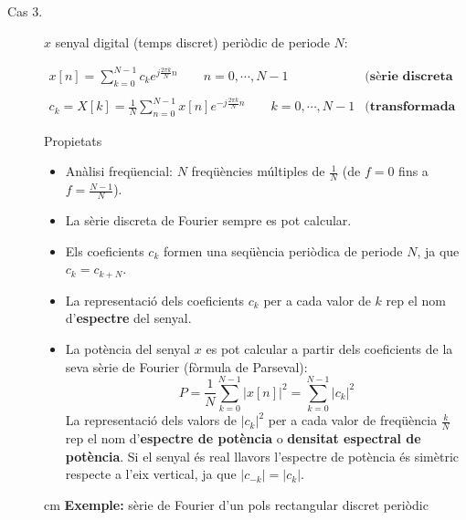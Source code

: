 \documentclass{article}
\begin{document}
\begin{description}
\newpage
\item[Cas 3.] $x$ senyal digital (temps discret) peri\`odic de periode $N$:

\[
\begin{array}{ll}
x[n]=\displaystyle \sum_{k=0}^{N-1} c_k e^{j \frac{2\pi k}{N} n} \qquad n=0, \cdots, N-1&  \textbf{(s\`erie discreta de Fourier)}\\ \\
c_k=X[k]=\displaystyle \frac{1}{N} \sum_{n=0}^{N-1} x[n] e^{-j \frac{2\pi k}{N} n} \qquad k=0, \cdots, N-1 & 
\textbf{(transformada discreta de Fourier (DFT))}
\end{array}
\]

\noindent
Propietats
\begin{itemize}
\item An\`alisi freq\"uencial: $N$ freq\"u\`encies m\'ultiples de $\frac{1}{N}$ (de $f=0$ fins a $f=\frac{N-1}{N}$).
\item La s\`erie discreta de Fourier sempre es pot calcular.
\item Els coeficients $c_k$ formen una seq\"u\`encia peri\`odica de periode $N$, ja que $c_k=c_{k+N}$.
\item La representaci\'o dels coeficients $c_k$ per a cada valor de $k$ rep el nom d'\textbf{espectre} del senyal.
\item La pot\`encia del senyal $x$ es pot calcular a partir dels coeficients de la seva s\`erie de Fourier
(f\`ormula de Parseval):
\[
P=\frac{1}{N} \sum_{k=0}^{N-1} |x[n]|^2  = \sum_{k=0}^{N-1} |c_k|^2
\]
\noindent
La representaci\'o dels valors de $|c_k|^2$ per a cada valor de freq\"u\`encia $\frac{k}{N}$ 
rep el nom d'\textbf{espectre de pot\`encia} o \textbf{densitat espectral de pot\`encia}.
Si el senyal \'es real llavors l'espectre de pot\`encia \'es sim\`etric respecte a l'eix vertical,
ja que $|c_{-k}| =|c_k|$. 
\end{itemize}

 cm
\noindent
\textbf{Exemple:} s\`erie de Fourier d'un pols rectangular discret peri\`odic


\end{description}
\end{document}
